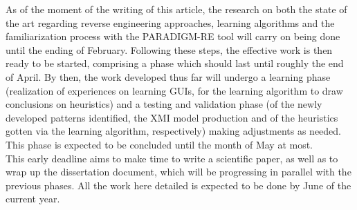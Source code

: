 As of the moment of the writing of this article, the research on both the state of the art regarding reverse engineering approaches, learning algorithms and the familiarization process with the PARADIGM-RE tool will carry on being done until the ending of February. Following these steps, the effective work is then ready to be started, comprising a phase which should last until roughly the end of April. By then, the work developed thus far will undergo a learning phase (realization of experiences on learning GUIs, for the learning algorithm to draw conclusions on heuristics) and a testing and validation phase (of the newly developed patterns identified, the XMI model production and of the heuristics gotten via the learning algorithm, respectively) making adjustments as needed. This phase is expected to be concluded until the month of May at most. \\
This early deadline aims to make time to write a scientific paper, as well as to wrap up the dissertation document, which will be progressing in parallel with the previous phases. All the work here detailed is expected to be done by June of the current year.